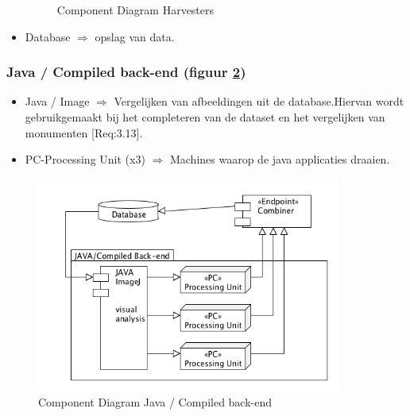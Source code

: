 \documentclass[a4paper,10pt]{article}
\begin{document}
\begin{itemize}
\begin{figure}[ht!]
				\caption{Component Diagram Harvesters \label{componentdiagramharvesters}}
				\end{figure}
			\item Database $\Rightarrow$ opslag van data.	
		\end{itemize}
		
		\subsubsection{Java / Compiled back-end (figuur \ref{componentdiagramprocessing})}
			\begin{itemize}
				\item Java / Image $\Rightarrow$ Vergelijken van afbeeldingen uit de database.Hiervan wordt gebruikgemaakt bij het completeren van de dataset en het vergelijken van monumenten [Req:3.13].
				\item PC-Processing Unit (x3) $\Rightarrow$ Machines waarop de java applicaties draaien.
			\end{itemize}
				\begin{figure}[ht!]
				\centering
				\includegraphics[width=10cm]{componentDiagram_processing.png}
				\caption{Component Diagram Java / Compiled back-end \label{componentdiagramprocessing}}
				\end{figure}
		
\end{document}
